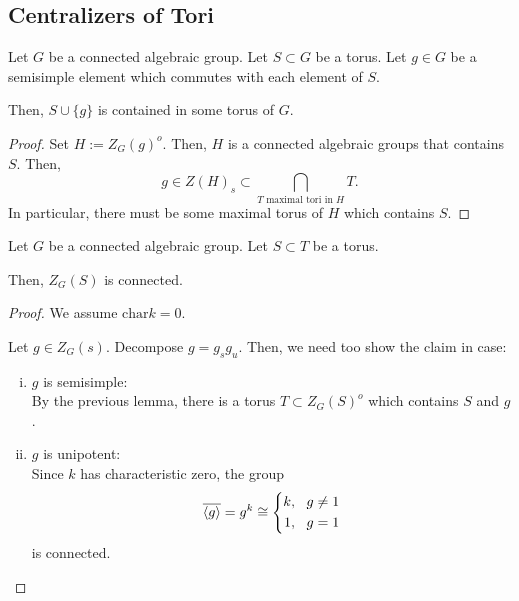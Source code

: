\subsection{Centralizers of Tori}

\begin{lemma}
	Let $G$ be a connected algebraic group. Let $S\subset G$ be a torus. Let $g \in G$ be a semisimple element which commutes with each element of $S$.
	
	Then, $S\cup\{g\}$ is contained in some torus of $G$.
\end{lemma}
\begin{proof}
	Set $H := Z_G(g)^o$. Then, $H$ is a connected algebraic groups that contains $S$. Then,
	\[ g \in Z(H)_s \subset \bigcap_{T \text{ maximal tori in }H}T. \]
	In particular, there must be some maximal torus of $H$ which contains $S$.
\end{proof}

\begin{theorem}
	Let $G$ be a connected algebraic group. Let $S\subset T$ be a torus.
	
	Then, $Z_G(S)$ is connected.
\end{theorem}
\begin{proof}
	We assume $\mathrm{char} k = 0$.
	
	Let $g \in Z_G(s)$. Decompose $g = g_sg_u$. Then, we need too show the claim in case:
	\begin{enumerate}[(i)]
		\item $g$ is semisimple:\\
		By the previous lemma, there is a torus $T\subset Z_G(S)^o$ which contains $S$ and $g$.
		\item $g$ is unipotent:\\
		Since $k$ has characteristic zero, the group
		\[ \overline{\left<g\right>} = g^k \overset{}{\cong} \left\lbrace 
		\begin{aligned}
		k, ~~ g\neq 1 \\ 1, ~~ g = 1
		\end{aligned}
		\right. \]
		is connected.
	\end{enumerate}
\end{proof}
